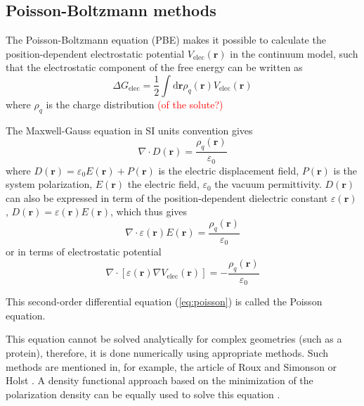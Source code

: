 \subsection{Poisson-Boltzmann methods\label{subsec:Poisson=002013Boltzmann-methods}}

The Poisson-Boltzmann equation (PBE) \citep{holst_1994_poisson} makes
it possible to calculate the position-dependent electrostatic potential
$V_{\mathrm{elec}}(\mathbf{r})$ in the continuum model, such that
the electrostatic component of the free energy can be written as
\begin{equation}
\Delta G_{\mathrm{elec}}=\frac{1}{2}\int\mathrm{d}\mathbf{r}\rho_{q}(\mathbf{r})V_{\mathrm{elec}}(\mathbf{r})
\end{equation}
where $\rho_{q}$ is the charge distribution \textcolor{red}{(of the
solute?)}

The Maxwell-Gauss equation in SI units convention gives
\begin{equation}
\nabla\cdot D(\mathbf{r})=\dfrac{\rho_{q}(\mathbf{r})}{\varepsilon_{0}}
\end{equation}
where $D(\mathbf{r})=\varepsilon_{0}E(\mathbf{r})+P(\mathbf{r})$
is the electric displacement field, $P(\mathbf{r})$ is the system
polarization, $E(\mathbf{r})$ the electric field, $\varepsilon_{0}$
the vacuum permittivity. $D(\mathbf{r})$ can also be expressed in
term of the position-dependent dielectric constant $\varepsilon(\mathbf{r})$,
$D(\mathbf{r})=\varepsilon(\mathbf{r})E(\mathbf{r})$, which thus
gives
\begin{equation}
\nabla\cdot\varepsilon(\mathbf{r})E(\mathbf{r})=\dfrac{\rho_{q}(\mathbf{r})}{\varepsilon_{0}}
\end{equation}
or in terms of electrostatic potential 
\begin{equation}
\nabla\cdot\left[\varepsilon(\mathbf{r})\nabla V_{\mathrm{elec}}(\mathbf{r})\right]=-\dfrac{\rho_{q}(\mathbf{r})}{\varepsilon_{0}}\label{eq:poisson}
\end{equation}

This second-order differential equation (\ref{eq:poisson}) is called
the Poisson equation. 

This equation cannot be solved analytically for complex geometries
(such as a protein), therefore, it is done numerically using appropriate
methods. Such methods are mentioned in, for example, the article of
Roux and Simonson \citep{roux_implicit_1999} or Holst \citep{holst_1994_poisson}.
A density functional approach based on the minimization of the polarization
density can be equally used to solve this equation \citep{Marchi_2001,Levy_2005}.

